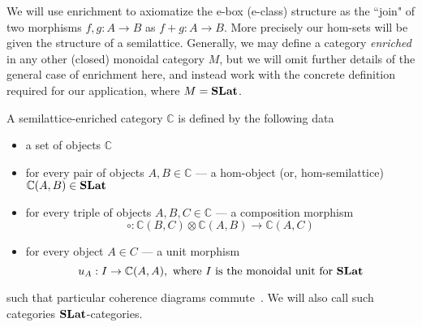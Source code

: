We will use enrichment to axiomatize the e-box (e-class) structure as the ``join" of two morphisms $f,g: A \to B$ as $f + g: A \to B$. 
More precisely our hom-sets will be given the structure of a semilattice.
Generally,  we may define a category \textit{enriched} in any other (closed) monoidal category $M$, but we will omit further details of the general case of enrichment here, and instead work with the concrete definition required for our application, where $M = \mathbf{SLat}$.

\begin{definition}
A semilattice-enriched category $\mathbb{C}$ is defined by the following data
\begin{itemize}
	\item a set of objects $\mathbb{C}$
	\item for every pair of objects $A,B \in \mathbb{C}$ --- a hom-object (or, hom-semilattice) $\mathbb{C}(A,B) \in \mathbf{SLat}$
	\item for every triple of objects $A,B,C \in \mathbb{C}$ --- a composition morphism
	\[
		\circ: \mathbb{C}(B,C) \otimes \mathbb{C}(A,B) \to \mathbb{C}(A,C)
	\]
	\item for every object $A \in C$ --- a unit morphism
	\[
	u_{A} : I \to \mathbb{C}(A,A), \text{ where $I$ is the monoidal unit for $\mathbf{SLat}$}
	\]
\end{itemize}
such that particular coherence diagrams commute~\cite{Borceux_1994}.
We will also call such categories $\mathbf{SLat}$-categories.
\end{definition}

